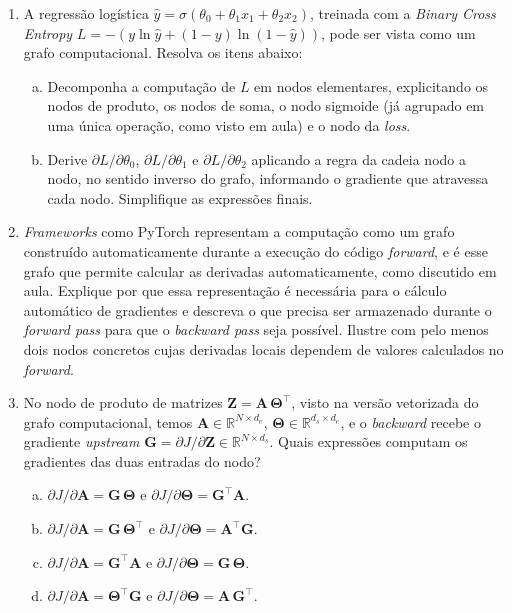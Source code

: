 \documentclass{dlproblemset}
\begin{document}
\begin{enumerate}[1)]
    \item A regressão logística $\hat{y} = \sigma(\theta_0 + \theta_1 x_1 + \theta_2 x_2)$, treinada com a \textit{Binary Cross Entropy} $L = -\left(y\ln\hat{y} + (1-y)\ln(1-\hat{y})\right)$, pode ser vista como um grafo computacional. Resolva os itens abaixo:
    \begin{enumerate}[a)]
        \item Decomponha a computação de $L$ em nodos elementares, explicitando os nodos de produto, os nodos de soma, o nodo sigmoide (já agrupado em uma única operação, como visto em aula) e o nodo da \textit{loss}.
        \item Derive $\partial L/\partial \theta_0$, $\partial L/\partial \theta_1$ e $\partial L/\partial \theta_2$ aplicando a regra da cadeia nodo a nodo, no sentido inverso do grafo, informando o gradiente que atravessa cada nodo. Simplifique as expressões finais.
    \end{enumerate}

    \item \textit{Frameworks} como PyTorch representam a computação como um grafo construído automaticamente durante a execução do código \textit{forward}, e é esse grafo que permite calcular as derivadas automaticamente, como discutido em aula. Explique por que essa representação é necessária para o cálculo automático de gradientes e descreva o que precisa ser armazenado durante o \textit{forward pass} para que o \textit{backward pass} seja possível. Ilustre com pelo menos dois nodos concretos cujas derivadas locais dependem de valores calculados no \textit{forward}.

    \item No nodo de produto de matrizes $\mathbf{Z} = \mathbf{A}\,\mathbf{\Theta}^{\top}$, visto na versão vetorizada do grafo computacional, temos $\mathbf{A} \in \mathbb{R}^{N\times d_e}$, $\mathbf{\Theta} \in \mathbb{R}^{d_s\times d_e}$, e o \textit{backward} recebe o gradiente \textit{upstream} $\mathbf{G} = \partial J/\partial \mathbf{Z} \in \mathbb{R}^{N\times d_s}$. Quais expressões computam os gradientes das duas entradas do nodo?
    \begin{enumerate}[(a)]
        \item $\partial J/\partial \mathbf{A} = \mathbf{G}\,\mathbf{\Theta}$ e $\partial J/\partial \mathbf{\Theta} = \mathbf{G}^{\top}\mathbf{A}$.
        \item $\partial J/\partial \mathbf{A} = \mathbf{G}\,\mathbf{\Theta}^{\top}$ e $\partial J/\partial \mathbf{\Theta} = \mathbf{A}^{\top}\mathbf{G}$.
        \item $\partial J/\partial \mathbf{A} = \mathbf{G}^{\top}\mathbf{A}$ e $\partial J/\partial \mathbf{\Theta} = \mathbf{G}\,\mathbf{\Theta}$.
        \item $\partial J/\partial \mathbf{A} = \mathbf{\Theta}^{\top}\mathbf{G}$ e $\partial J/\partial \mathbf{\Theta} = \mathbf{A}\,\mathbf{G}^{\top}$.
    \end{enumerate}


\end{enumerate}
\end{document}
